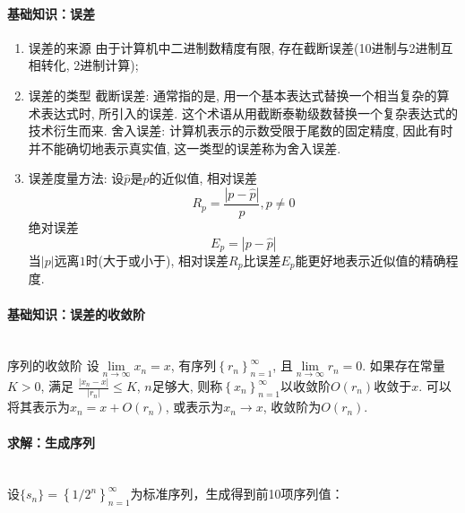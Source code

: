 \paragraph{基础知识：误差}
\begin{enumerate}
	\item 误差的来源
	由于计算机中二进制数精度有限, 存在截断误差(10进制与2进制互相转化, 2进制计算); 
	\item 误差的类型
	\subitem 截断误差: 通常指的是, 用一个基本表达式替换一个相当复杂的算术表达式时, 所引入的误差. 这个术语从用截断泰勒级数替换一个复杂表达式的技术衍生而来.
	\subitem 舍入误差: 计算机表示的示数受限于尾数的固定精度, 因此有时并不能确切地表示真实值, 这一类型的误差称为舍入误差.
	\item 误差度量方法: 
	设$\hat{p}$是$p$的近似值,
	\subitem 相对误差
	$$R_p = \frac{\left|p-\hat{p} \right|}{p}, p\neq 0$$
	\subitem 绝对误差
	$$E_p = \left|p - \hat{p}\right|$$
	\subitem 当$\left|p\right|$远离$1$时(大于或小于), 相对误差$R_p$比误差$E_p$能更好地表示近似值的精确程度.
\end{enumerate}

\paragraph{基础知识：误差的收敛阶}
~\\[.5em]
序列的收敛阶
设$\lim\limits_{n\to \infty}x_n = x$, 有序列$\left\{r_n \right\}_{n=1}^{\infty}$, 且$\lim\limits_{n \to \infty}r_n = 0$. 如果存在常量$K>0$, 满足
$\frac{\left|x_n - x\right|}{\left|r_n \right|} \leq K$, $n$足够大, 则称$\left\{ x_n\right\}_{n=1}^{\infty}$以收敛阶$O\left(r_n\right)$收敛于$x$.
可以将其表示为$x_n = x + O \left(r_n\right)$, 或表示为$x_n \to x$, 收敛阶为$O\left(r_n\right)$.
\paragraph{求解：生成序列}
~\\[.5em]
设$\{s_n\} = \left\{1/2^n\right\}_{n=1}^\infty$为标准序列，生成得到前10项序列值：

